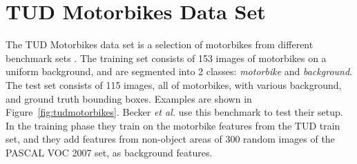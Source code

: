 \section{TUD Motorbikes Data Set} %
\label{sec:tudmotorbikes_data_set}
The TUD Motorbikes data set is a selection of motorbikes from different benchmark sets \cite{fritz2005integrating}. The training set consists of 153 images of motorbikes on a uniform background, and are segmented into 2 classes: \emph{motorbike} and \emph{background}. The test set consists of 115 images, all of motorbikes, with various background, and ground truth bounding boxes. Examples are shown in Figure~\ref{fig:tudmotorbikes}. Becker \emph{et al.} \cite{becker2012codebook} use this benchmark to test their setup. In the training phase they train on the motorbike features from the TUD train set, and they add features from non-object areas of 300 random images of the PASCAL VOC 2007 set, as background features.

